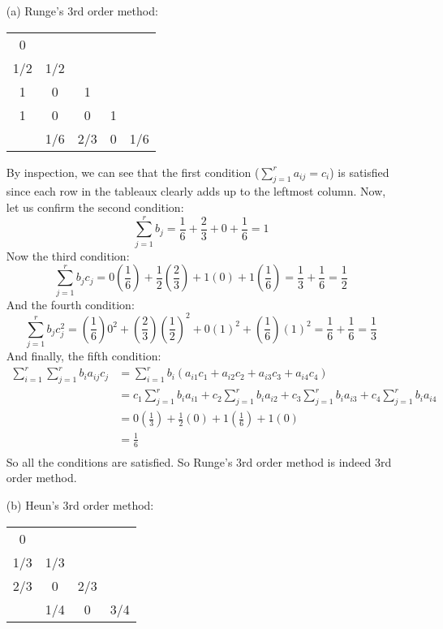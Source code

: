 \documentclass{article}
\begin{document}
\begin{enumerate}
    \item[(a)] Runge's 3rd order method:
    \newline
    \begin{center}
        \begin{tabular}{c|c c c c}
            0 & & & &  \\
            1/2 & 1/2 & & & \\
            1 & 0 & 1 & & \\
            1 & 0 & 0 & 1 & \\
            \hline
            & 1/6 & 2/3 & 0 & 1/6 \\
        \end{tabular}
    \end{center}
    By inspection, we can see that the first condition ($\sum_{j=1}^ra_{ij} = c_i$) is satisfied since each row in the tableaux clearly adds up to the leftmost column. Now, let us confirm the second condition:
    \[\sum_{j=1}^rb_j = \frac{1}{6} + \frac{2}{3} + 0 + \frac{1}{6} = 1\]
    Now the third condition:
    \[\sum_{j=1}^rb_jc_j = 0\left(\frac{1}{6}\right) + \frac{1}{2}\left(\frac{2}{3}\right) + 1(0) + 1\left(\frac{1}{6}\right) = \frac{1}{3} + \frac{1}{6} = \frac{1}{2}\]
    And the fourth condition:
    \[\sum_{j=1}^rb_jc_j^2 = \left(\frac{1}{6}\right)0^2 + \left(\frac{2}{3}\right)\left(\frac{1}{2}\right)^2 + 0(1)^2 + \left(\frac{1}{6}\right)(1)^2 = \frac{1}{6} + \frac{1}{6} = \frac{1}{3}\]
    And finally, the fifth condition:
    \begin{align*}
        \sum_{i=1}^r\sum_{j=1}^rb_ia_{ij}c_j &= \sum_{i=1}^rb_i(a_{i1}c_1 + a_{i2}c_2 + a_{i3}c_3 + a_{i4}c_4) \\
       &= c_1\sum_{j=1}^rb_ia_{i1} + c_2\sum_{j=1}^rb_ia_{i2} + c_3\sum_{j=1}^rb_ia_{i3} + c_4\sum_{j=1}^rb_ia_{i4} \\
       &= 0\left(\frac{1}{3}\right) + \frac{1}{2}\left(0\right) + 1\left(\frac{1}{6}\right) + 1(0) \\
       &= \frac{1}{6} \\
    \end{align*}
    So all the conditions are satisfied. So Runge's 3rd order method is indeed 3rd order method.
    
    \item[(b)] Heun's 3rd order method:
    \newline
    \begin{center}
        \begin{tabular}{c|c c c}
            0 & & & \\
            1/3 & 1/3 & & \\
            2/3 & 0 & 2/3 & \\
            \hline
             & 1/4 & 0 & 3/4 \\
        \end{tabular}
    \end{center}
\end{enumerate}
\end{document}
